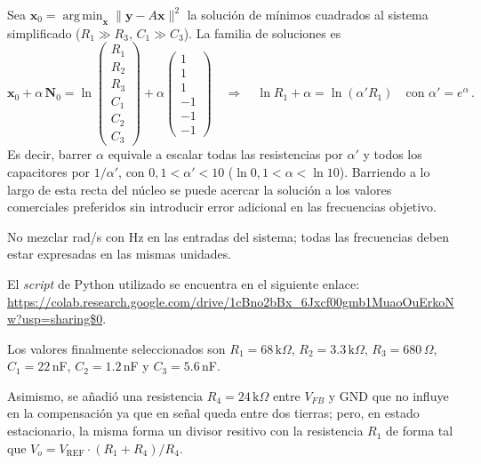 Sea $\mathbf{x}_0 = \operatorname*{arg\,min}_{\mathbf{x}} \|\mathbf{y} - A\mathbf{x}\|^2$ la solución de mínimos cuadrados al sistema simplificado ($R_1 \gg R_3$, $C_1 \gg C_3$). La familia de soluciones es
\begin{equation*}
    \mathbf{x}_0 + \alpha\,\mathbf{N}_0 = \ln \begin{pmatrix} R_1 \\ R_2 \\ R_3 \\ C_1 \\ C_2 \\ C_3 \end{pmatrix} + \alpha \begin{pmatrix} 1 \\ 1 \\ 1 \\ -1 \\ -1 \\ -1 \end{pmatrix}
    \quad \Rightarrow \quad \ln R_1 + \alpha = \ln(\alpha' R_1) \quad \text{con } \alpha' = e^\alpha \, .
\end{equation*}
Es decir, barrer $\alpha$ equivale a escalar todas las resistencias por $\alpha'$ y todos los capacitores por $1/\alpha'$, con $0{,}1 < \alpha' < 10$ ($\ln 0{,}1 < \alpha < \ln 10$). Barriendo a lo largo de esta recta del núcleo se puede acercar la solución a los valores comerciales preferidos sin introducir error adicional en las frecuencias objetivo.

No mezclar rad/s con Hz en las entradas del sistema; todas las frecuencias deben estar expresadas en las mismas unidades.

El \textit{script} de Python utilizado se encuentra en el siguiente enlace: \url{https://colab.research.google.com/drive/1cBno2bBx_6Jxcf00gmb1MuaoOuErkoNw?usp=sharing$0}.

Los valores finalmente seleccionados son $R_1 = 68\,\text{k}\Omega$, $R_2 = 3.3\,\text{k}\Omega$, $R_3 = 680\,\Omega$, $C_1 = 22\,$nF, $C_2 = 1.2\,$nF y $C_3 = 5.6 \,$nF.

Asimismo, se añadió una resistencia $R_4 = 24\,\text{k}\Omega$ entre $V_{FB}$ y GND que no influye en la compensación ya que en señal queda entre dos tierras; pero, en estado estacionario, la misma forma un divisor resitivo con la resistencia $R_1$ de forma tal que $V_o = V_\text{REF} \cdot (R_1 + R_4)/R_4$.